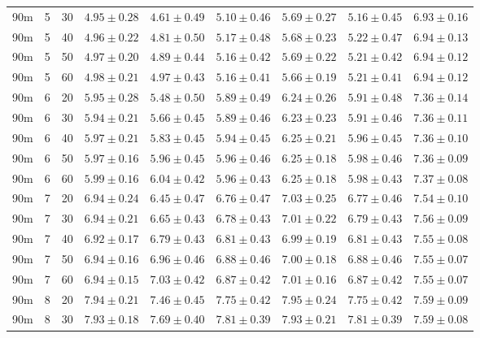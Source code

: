 \begin{table}
\begin{center}
\begin{tabular}{ccc|c|ccccc}
  90m &   5 &  30 & $4.95 \pm 0.28$ & $4.61 \pm 0.49$ & $5.10 \pm 0.46$ & $5.69 \pm 0.27$ & $5.16 \pm 0.45$ & $6.93 \pm 0.16$ \\ 
  90m &   5 &  40 & $4.96 \pm 0.22$ & $4.81 \pm 0.50$ & $5.17 \pm 0.48$ & $5.68 \pm 0.23$ & $5.22 \pm 0.47$ & $6.94 \pm 0.13$ \\ 
  90m &   5 &  50 & $4.97 \pm 0.20$ & $4.89 \pm 0.44$ & $5.16 \pm 0.42$ & $5.69 \pm 0.22$ & $5.21 \pm 0.42$ & $6.94 \pm 0.12$ \\ 
  90m &   5 &  60 & $4.98 \pm 0.21$ & $4.97 \pm 0.43$ & $5.16 \pm 0.41$ & $5.66 \pm 0.19$ & $5.21 \pm 0.41$ & $6.94 \pm 0.12$ \\ 
   \hline
90m &   6 &  20 & $5.95 \pm 0.28$ & $5.48 \pm 0.50$ & $5.89 \pm 0.49$ & $6.24 \pm 0.26$ & $5.91 \pm 0.48$ & $7.36 \pm 0.14$ \\ 
  90m &   6 &  30 & $5.94 \pm 0.21$ & $5.66 \pm 0.45$ & $5.89 \pm 0.46$ & $6.23 \pm 0.23$ & $5.91 \pm 0.46$ & $7.36 \pm 0.11$ \\ 
  90m &   6 &  40 & $5.97 \pm 0.21$ & $5.83 \pm 0.45$ & $5.94 \pm 0.45$ & $6.25 \pm 0.21$ & $5.96 \pm 0.45$ & $7.36 \pm 0.10$ \\ 
  90m &   6 &  50 & $5.97 \pm 0.16$ & $5.96 \pm 0.45$ & $5.96 \pm 0.46$ & $6.25 \pm 0.18$ & $5.98 \pm 0.46$ & $7.36 \pm 0.09$ \\ 
  90m &   6 &  60 & $5.99 \pm 0.16$ & $6.04 \pm 0.42$ & $5.96 \pm 0.43$ & $6.25 \pm 0.18$ & $5.98 \pm 0.43$ & $7.37 \pm 0.08$ \\ 
   \hline
90m &   7 &  20 & $6.94 \pm 0.24$ & $6.45 \pm 0.47$ & $6.76 \pm 0.47$ & $7.03 \pm 0.25$ & $6.77 \pm 0.46$ & $7.54 \pm 0.10$ \\ 
  90m &   7 &  30 & $6.94 \pm 0.21$ & $6.65 \pm 0.43$ & $6.78 \pm 0.43$ & $7.01 \pm 0.22$ & $6.79 \pm 0.43$ & $7.56 \pm 0.09$ \\ 
  90m &   7 &  40 & $6.92 \pm 0.17$ & $6.79 \pm 0.43$ & $6.81 \pm 0.43$ & $6.99 \pm 0.19$ & $6.81 \pm 0.43$ & $7.55 \pm 0.08$ \\ 
  90m &   7 &  50 & $6.94 \pm 0.16$ & $6.96 \pm 0.46$ & $6.88 \pm 0.46$ & $7.00 \pm 0.18$ & $6.88 \pm 0.46$ & $7.55 \pm 0.07$ \\ 
  90m &   7 &  60 & $6.94 \pm 0.15$ & $7.03 \pm 0.42$ & $6.87 \pm 0.42$ & $7.01 \pm 0.16$ & $6.87 \pm 0.42$ & $7.55 \pm 0.07$ \\ 
   \hline
90m &   8 &  20 & $7.94 \pm 0.21$ & $7.46 \pm 0.45$ & $7.75 \pm 0.42$ & $7.95 \pm 0.24$ & $7.75 \pm 0.42$ & $7.59 \pm 0.09$ \\ 
  90m &   8 &  30 & $7.93 \pm 0.18$ & $7.69 \pm 0.40$ & $7.81 \pm 0.39$ & $7.93 \pm 0.21$ & $7.81 \pm 0.39$ & $7.59 \pm 0.08$ \\ 

\end{tabular}
\end{center}
\end{table}
